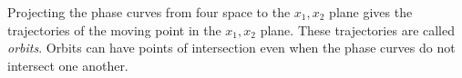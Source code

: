 Projecting the phase curves from four space to the $x_1, x_2$ plane gives the trajectories of the moving point in the $x_1, x_2$ plane.
These trajectories are called \textit{orbits}. Orbits can have points of intersection even when the phase curves do not intersect one another.
